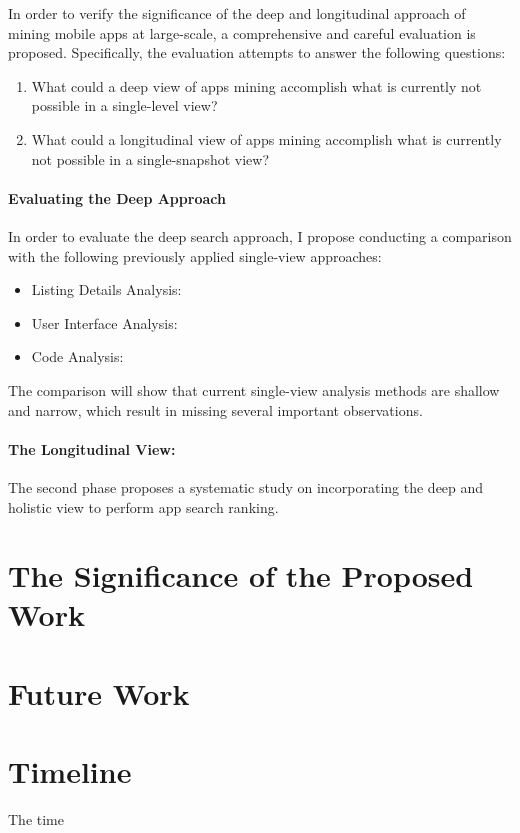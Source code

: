 In order to verify the significance of the deep and longitudinal approach of mining mobile apps at large-scale, a comprehensive and careful evaluation is proposed.
Specifically, the evaluation attempts to answer the following questions:
\begin{enumerate}
	\item What could a deep view of apps mining accomplish what is currently not possible in a single-level view?
	\item What could a longitudinal view of apps mining accomplish what is currently not possible in a single-snapshot view?
\end{enumerate}

\noindent \paragraph{Evaluating the Deep Approach}
In order to evaluate the deep search approach, I propose conducting a comparison with the following previously applied single-view approaches:
\begin{itemize}
	\item Listing Details Analysis:
	\item User Interface Analysis:
	\item Code Analysis:
\end{itemize}
The comparison will show that current single-view analysis methods are shallow and narrow, which result in missing several important observations.

\paragraph{The Longitudinal View:}
The second phase proposes a systematic study on incorporating the deep and holistic view to perform app search ranking.

\section{The Significance of the Proposed Work}

\section{Future Work}
\section{Timeline}
The time


